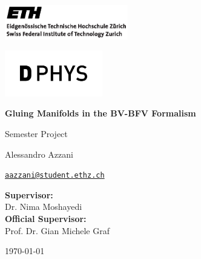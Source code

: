 \begin{titlepage}
    \noindent
    \begin{minipage}{0.4\textwidth}
        \begin{flushleft}
            \includegraphics[height=1.5cm]{Title/eth_logo_2.eps}
        \end{flushleft}
    \end{minipage}
    \hfill
    \begin{minipage}{0.4\textwidth}
        \begin{flushright}
            \includegraphics[height=2cm]{Title/dphys.png}
        \end{flushright}
    \end{minipage}

    \vspace{3cm}

    \begin{center}
        \begin{spacing}{2.0}
            {\huge \bfseries Gluing Manifolds in the BV-BFV Formalism}
        \end{spacing}

        \large
        Semester Project
    \end{center}

    \vspace{1.2cm}

    \begin{center}
        \large
        Alessandro Azzani

        \begingroup
            \hypersetup{urlcolor=black}
            \href{mailto:aazzani@student.ethz.ch}
            {\texttt{\small aazzani@student.ethz.ch}} 
        \endgroup
    \end{center}

    \vfill

    \begin{center}
        \textbf{Supervisor:} \\
        Dr. Nima Moshayedi \\

        \vspace{0.2cm}
        \textbf{Official Supervisor:} \\
        Prof. Dr. Gian Michele Graf
    \end{center}

    \vspace{0.5cm}

    \begin{center}
        \today
    \end{center}
\end{titlepage}